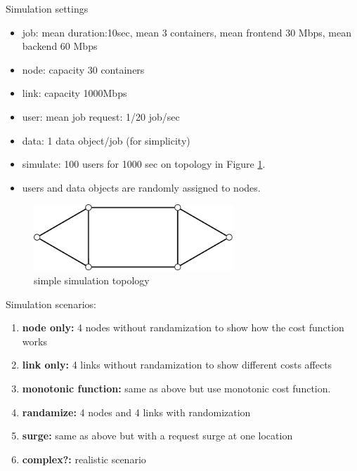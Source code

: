 
Simulation settings
\begin{itemize}
\item		job: mean duration:10sec, mean 3 containers,
  mean frontend 30 Mbps, mean backend 60 Mbps
\item		node: capacity 30 containers
\item		link: capacity 1000Mbps
\item		user: mean job request: 1/20 job/sec
\item		data: 1 data object/job (for simplicity)
\item		simulate: 100 users for 1000 sec on topology in Figure \ref{fig:topology-simple}.
\item		users and data objects are randomly assigned to nodes.
\end{itemize}

\begin{figure}[htb]
\begin{center}
\includegraphics[width=7.5cm,clip]{topology-simple.pdf}
\vspace{-2.0ex}
\caption{simple simulation topology}
\label{fig:topology-simple}
\end{center}
\end{figure}

Simulation scenarios:

\begin{enumerate}
\item	{\bf node only:} 4 nodes without randamization to show how the
  cost function works
\item	{\bf link only:} 4 links without randamization to show
  different costs affects
\item	{\bf monotonic function:} same as above but use monotonic cost
  function.
\item	{\bf randamize:} 4 nodes and 4 links with randomization
\item	{\bf surge:} same as above but with a request surge at one location
\item	{\bf complex?:} realistic scenario
\end{enumerate}
